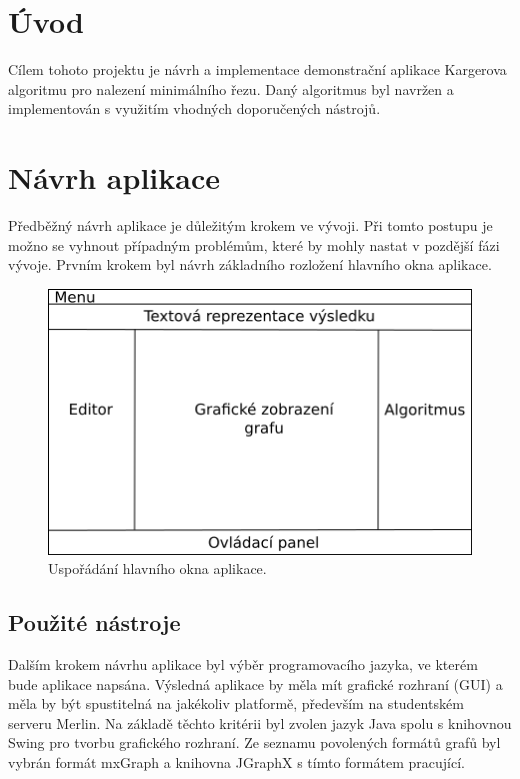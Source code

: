 \documentclass[../projekt.tex]{subfiles}
\begin{document}

\section{Úvod}\label{uvod}

Cílem tohoto projektu je návrh a implementace demonstrační aplikace Kargerova
algoritmu pro nalezení minimálního řezu. Daný algoritmus byl navržen a
implementován s využitím vhodných doporučených nástrojů. 

\section{Návrh aplikace}

Předběžný návrh aplikace je důležitým krokem ve vývoji. Při tomto postupu je
možno se vyhnout případným problémům, které by mohly nastat v pozdější
fázi vývoje. Prvním krokem byl návrh základního rozložení hlavního okna aplikace.

	\begin{figure}[ht]
    	\begin{center}
  			\includegraphics[scale=0.7]{obrazky-figures/layout.png}
  			\caption{Uspořádání hlavního okna aplikace.}
  			\label{fig:layout}
  		\end{center}
	\end{figure}

\subsection{Použité nástroje}

Dalším krokem návrhu aplikace byl výběr programovacího jazyka,
ve kterém bude aplikace napsána. Výsledná aplikace by měla mít grafické
rozhraní (GUI) a měla by být spustitelná na jakékoliv platformě,
především na studentském serveru Merlin. Na základě těchto kritérii byl
zvolen jazyk Java spolu s knihovnou Swing pro tvorbu grafického rozhraní.
Ze seznamu povolených formátů grafů byl vybrán formát mxGraph a knihovna
JGraphX s tímto formátem pracující.
\end{document}
